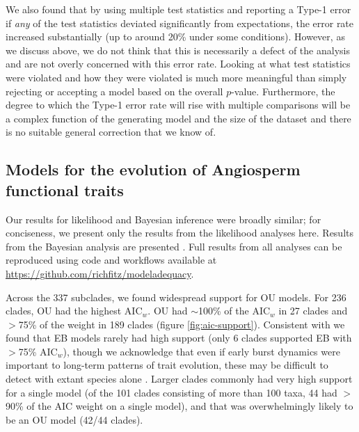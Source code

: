 We also found that by using multiple test statistics and reporting a Type-1 error if \emph{any} of the test statistics deviated significantly from expectations, the error rate increased substantially (up to around 20\% under some conditions). However, as we discuss above, we do not think that this is necessarily a defect of the analysis and are not overly concerned with this error rate. Looking at what test statistics were violated and how they were violated is much more meaningful than simply rejecting or accepting a model based on the overall $p$-value. Furthermore, the degree to which the Type-1 error rate will rise with multiple comparisons will be a complex function of the generating model and the size of the dataset and there is no suitable general correction that we know of.

\subsection{Models for the evolution of Angiosperm functional traits}

Our results for likelihood and Bayesian inference were broadly similar; for conciseness, we present only the results from the likelihood analyses here. Results from the Bayesian analysis are presented . Full results from all analyses can be reproduced using code and workflows available at \url{https://github.com/richfitz/modeladequacy}. 

Across the 337 subclades, we found widespread support for OU
models. For 236 clades, OU had the highest AIC$_w$.
OU had $\sim$100\% of the AIC$_w$ in 27 clades and $>$75\% of the weight in 189 clades (figure \ref{fig:aic-support}). Consistent with \citet{Harmon2010} we found that EB models rarely had high support (only 6 clades supported EB with $>$75\% AIC$_w$), though we acknowledge that even if early burst dynamics were important to long-term patterns of trait evolution, these may be difficult to detect with extant species alone \citep{Slater2012Fossil, SlaterPennell}. Larger clades commonly had
very high support for a single model (of the 101 clades consisting of more than 100 taxa, 44 had $>$90\% of the AIC weight on a single model),
and that was overwhelmingly likely to be an OU model (42/44 clades). 

